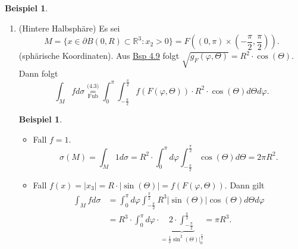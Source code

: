 \documentclass[a4paper]{report}
\newcommand{\R}{\mathbb{R}}
\newcommand{\overunderset}[3]{\overset{#1}{\underset{#3}{#2}}}
\newcommand{\jlabel}[1]{\label{j_#1}}
\newcommand{\jshortlink}[1]{\jhyperref{#1}{\text{#1}}}
\newcommand{\jhyperref}[2]{\hyperref[j_#1]{#2}}
\newcommand{\jlink}[1]{\jhyperref{#1}{#1}}
\newcommand{\jshortlinkFubini}{\jhyperref{Fubini}{\text{Fub}}}
\theoremstyle{plain}
\theoremstyle{definition}
\newtheorem{expl}[thm]{Beispiel}
\newtheorem*{expl*}{Beispiel}
\begin{document}
{{{{\jlabel{Bsp 4.10}
\begin{expl}
    \begin{enumerate}
        \item 
            \jlabel{Bsp 4.10a)}
            (Hintere Halbsphäre) Es sei
            \[
                M = \{x\in \partial B(0,R) \subset \R^3 : x_2 > 0\} = F\left((0,\pi) \times \left(-\frac{\pi}{2},\frac{\pi}{2}\right)\right).
            \]
            (sphärische Koordinaten). Aus \jlink{Bsp 4.9} folgt $\sqrt{g_F(\varphi,\Theta)} = R^2\cdot \cos(\Theta)$. Dann folgt
            \[
                \int_M f d\sigma \overunderset{\jshortlink{(4.3)}}{=}{\jshortlinkFubini} \int_0^\pi\int_{-\frac{\pi}{2}}^{\frac{\pi}{2}} f(F(\varphi,\Theta))\cdot R^2\cdot \cos(\Theta) d\Theta d\varphi.
            \]
            \begin{expl*}
                \begin{itemize}
                    \item Fall $f=1$.
                        \[
                            \sigma(M) = \int_M 1 d\sigma = R^2\cdot \int_0^\pi d\varphi \int_{-\frac{\pi}{2}}^{\frac{\pi}{2}} \cos(\Theta) d\Theta = 2\pi R^2.
                        \]
                    \item Fall $f(x) = |x_3| = R\cdot |\sin(\Theta)| = f(F(\varphi, \Theta))$. Dann gilt
                        \[
                            \begin{split}
                                \int_M f d\sigma &= \int_0^\pi d\varphi \int_{-\frac{\pi}{2}}^{\frac{\pi}{2}} R^3 |\sin(\Theta)| \cos(\Theta) d\Theta d\varphi\\
                                                 &= R^3\cdot \int_0^\pi d\varphi \cdot \underbrace{2\cdot \int_{-\frac{\pi}{2}}^{\frac{\pi}{2}}}_{=\frac{1}{2}\sin^2(\Theta)|_0^\frac{\pi}{2}} = \pi R^3.
                            \end{split}
                        \]
                \end{itemize}
            \end{expl*}
        

\end{enumerate}
\end{expl}}}}}
\end{document}
